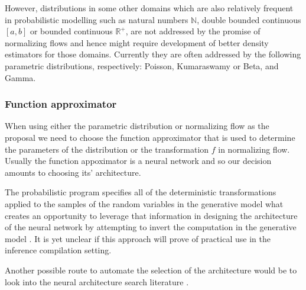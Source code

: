 \documentclass[12pt]{article}
\begin{document}

However, distributions in some other domains which are also relatively frequent in probabilistic modelling such as natural numbers $\mathbb{N}$, double bounded continuous $[a,b]$ or bounded continuous $\mathbb{R}^+$, are not addressed by the promise of normalizing flows and hence might require development of better density estimators for those domains.
Currently they are often addressed by the following parametric distributions, respectively: Poisson, Kumaraswamy or Beta, and Gamma.



\subsubsection*{Function approximator}
When using either the parametric distribution or normalizing flow as the proposal we need to choose the function approximator that is used to determine the parameters of the distribution or the transformation $f$ in normalizing flow.
Usually the function appoximator is a neural network and so our decision amounts to choosing its' architecture.

The probabilistic program specifies all of the deterministic transformations applied to the samples of the random variables in the generative model
what creates an opportunity to leverage that information in designing the architecture of the neural network by attempting to invert the computation in the generative model \citep{TavaresEtAl2016,TavaresEtAl2017}.
It is yet unclear if this approach will prove of practical use in the inference compilation setting.

Another possible route to automate the selection of the architecture would be to look into the neural architecture search literature \citep{ElskenEtAl2018,ZophLe2017,pham18a}.






\end{document}
